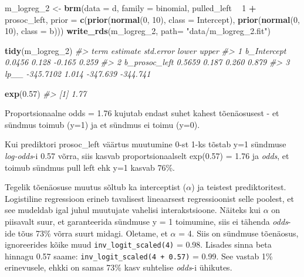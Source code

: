 \documentclass[]{book}
\newenvironment{Shaded}{\begin{snugshade}}{\end{snugshade}}
\newcommand{\CommentTok}[1]{\textcolor[rgb]{0.56,0.35,0.01}{\textit{#1}}}
\newcommand{\DataTypeTok}[1]{\textcolor[rgb]{0.13,0.29,0.53}{#1}}
\newcommand{\DecValTok}[1]{\textcolor[rgb]{0.00,0.00,0.81}{#1}}
\newcommand{\FloatTok}[1]{\textcolor[rgb]{0.00,0.00,0.81}{#1}}
\newcommand{\KeywordTok}[1]{\textcolor[rgb]{0.13,0.29,0.53}{\textbf{#1}}}
\newcommand{\NormalTok}[1]{#1}
\newcommand{\OperatorTok}[1]{\textcolor[rgb]{0.81,0.36,0.00}{\textbf{#1}}}
\newcommand{\StringTok}[1]{\textcolor[rgb]{0.31,0.60,0.02}{#1}}
\begin{document}
\begin{Shaded}
\begin{Highlighting}[]
\NormalTok{m_logreg_}\DecValTok{2}\NormalTok{ <-}
\StringTok{  }\KeywordTok{brm}\NormalTok{(}\DataTypeTok{data =}\NormalTok{ d, }\DataTypeTok{family =}\NormalTok{ binomial,}
\NormalTok{      pulled_left }\OperatorTok{~}\StringTok{ }\DecValTok{1} \OperatorTok{+}\StringTok{ }\NormalTok{prosoc_left,}
      \DataTypeTok{prior =} \KeywordTok{c}\NormalTok{(}\KeywordTok{prior}\NormalTok{(}\KeywordTok{normal}\NormalTok{(}\DecValTok{0}\NormalTok{, }\DecValTok{10}\NormalTok{), }\DataTypeTok{class =}\NormalTok{ Intercept),}
                \KeywordTok{prior}\NormalTok{(}\KeywordTok{normal}\NormalTok{(}\DecValTok{0}\NormalTok{, }\DecValTok{10}\NormalTok{), }\DataTypeTok{class =}\NormalTok{ b)))}
\KeywordTok{write_rds}\NormalTok{(m_logreg_}\DecValTok{2}\NormalTok{, }\DataTypeTok{path=} \StringTok{"data/m_logreg_2.fit"}\NormalTok{)}
\end{Highlighting}
\end{Shaded}

\begin{Shaded}
\begin{Highlighting}[]
\KeywordTok{tidy}\NormalTok{(m_logreg_}\DecValTok{2}\NormalTok{)}
\CommentTok{#>            term  estimate std.error    lower    upper}
\CommentTok{#> 1   b_Intercept    0.0456     0.128   -0.165    0.259}
\CommentTok{#> 2 b_prosoc_left    0.5659     0.187    0.260    0.879}
\CommentTok{#> 3          lp__ -345.7102     1.014 -347.639 -344.741}
\end{Highlighting}
\end{Shaded}

\begin{Shaded}
\begin{Highlighting}[]
\KeywordTok{exp}\NormalTok{(}\FloatTok{0.57}\NormalTok{)}
\CommentTok{#> [1] 1.77}
\end{Highlighting}
\end{Shaded}

Proportsionaalne odds = 1.76 kujutab endast suhet kahest tõenäosusest - et sündmus toimub (y=1) ja et sündmus ei toimu (y=0).

Kui prediktori prosoc\_left väärtus muutumine 0-st 1-ks tõstab y=1 sündmuse \emph{log-odds}-i 0.57 võrra, siis kasvab proportsionaalselt exp(0.57) = 1.76 ja \emph{odds}, et toimub sündmus pull left ehk y=1 kasvab 76\%.

Tegelik tõenäosuse muutus sõltub ka interceptist (\(\alpha\)) ja teistest prediktoritest. Logistiline regressioon erineb tavalisest lineaarsest regressioonist selle poolest, et see mudeldab igal juhul muutujate vahelisi interakstsioone. Näiteks kui \(\alpha\) on piisavalt suur, et garanteerida sündmuse y = 1 toimumine, siis ei tähenda \emph{odds}-ide tõus 73\% võrra suurt midagi. Oletame, et \(\alpha\) = 4. Siis on sündmuse tõenäosus, ignoreerides kõike muud \texttt{inv\_logit\_scaled(4)} = 0.98. Lisades sinna beta hinnagu 0.57 saame: \texttt{inv\_logit\_scaled(4\ +\ 0.57)} = 0.99.
See vastab 1\% erinevusele, ehkki on samas 73\% kasv suhtelise \emph{odds}-i ühikutes.
\end{document}

